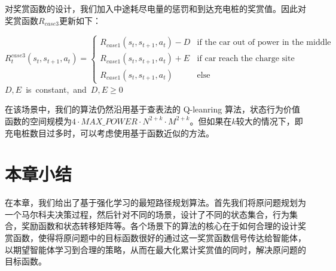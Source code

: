 \documentclass{standalone}
\begin{document}
对奖赏函数的设计，我们加入中途耗尽电量的惩罚和到达充电桩的奖赏值。因此对奖赏函数$R_{case3}$更新如下：
\begin{center}
    \begin{equation}
    \label{eq3reward}
    R_t^{case3}(s_t, s_{t+1}, a_t) = \begin{cases}
     R_{case1}(s_t, s_{t+1}, a_t) - D &\mbox{if the car out of power in the middle}\\
     R_{case1}(s_t, s_{t+1}, a_t) + E&\mbox{if car reach the charge site}\\
     R_{case1}(s_t, s_{t+1}, a_t)&\mbox{else}
    \end{cases}
    \end{equation}
    \mbox{$D, E$ is constant, and $D, E \geq 0$}

\end{center}
在该场景中，我们的算法仍然沿用基于查表法的 Q-leanring 算法，状态行为价值函数的空间规模为$4\cdot MAX\_POWER\cdot N^{2+k} \cdot M^{2+k}$。但如果在$k$较大的情况下，即充电桩数目过多时，可以考虑使用基于函数近似的方法。
\section{本章小结}
在本章，我们给出了基于强化学习的最短路径规划算法。首先我们将原问题规划为一个马尔科夫决策过程，然后针对不同的场景，设计了不同的状态集合，行为集合，奖励函数和状态转移矩阵等。各个场景下的算法的核心在于如何合理的设计奖赏函数，使得将原问题中的目标函数很好的通过这一奖赏函数信号传达给智能体，以期望智能体学习到合理的策略，从而在最大化累计奖赏值的同时，解决原问题的目标函数。
\end{document}
